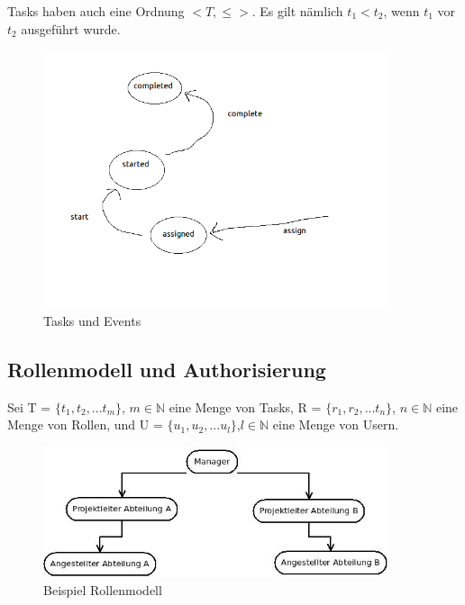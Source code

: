 Tasks haben auch eine Ordnung $<T, \leq>$. Es gilt nämlich $t_1 < t_2 $, wenn $t_1$ vor $t_2$ ausgeführt wurde.

\begin{figure}[ht]
	\centering
  \includegraphics[width=0.9\textwidth]{"Figures/Task Events"}
	\caption{Tasks und Events}
	\label{fig2}
\end{figure}


\subsection{Rollenmodell und Authorisierung}
Sei T = $\{t_1,t_2,...t_m\}$, $m\in\mathbb{N}$ eine Menge von Tasks, R = $\{r_1,r_2,...t_n\}$, $n\in\mathbb{N}$ eine Menge von Rollen, und U = $\{u_1,u_2,...u_l\}$,$l\in\mathbb{N}$ eine Menge von Usern.

\begin{figure}[ht]
	\centering
  \includegraphics[width=0.9\textwidth]{"Figures/Rollenmodell"}
	\caption{Beispiel Rollenmodell}
	\label{fig:examplerolemodel}
\end{figure}

